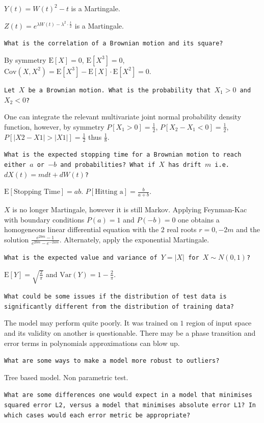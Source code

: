 $Y(t)=W(t)^2-t$ is a Martingale.

$Z(t)=e^{\lambda W(t) - \lambda^2 \cdot \frac{t}{2}}$ is a Martingale.

\texttt{What is the correlation of a Brownian motion and its square?}

By symmetry $\text{E}[X] = 0$, $\text{E}[X^3] = 0$, $\text{Cov}(X,X^2) = \text{E}[X^3]-\text{E}[X] \cdot \text{E}[X^2] = \boxed{0}$.

\texttt{Let $X$ be a Brownian motion. What is the probability that $X_1>0$ and $X_2<0$?}

One can integrate the relevant multivariate joint normal probability density function, however, by symmetry $P[X_1>0]=\frac{1}{2}$, $P[X_2-X_1<0]=\frac{1}{2}$, $P[|X2-X1|>|X1|]=\frac{1}{2}$ thus $\boxed{\frac{1}{8}}$.

\texttt{What is the expected stopping time for a Brownian motion to reach either $a$ or $-b$ and probabilities? What if $X$ has drift $m$ i.e. $dX(t)=m dt+d W(t)$?}

$\text{E}[\text{Stopping Time}]=\boxed{ab}$. $P[\text{Hitting a}]=\boxed{\frac{b}{a+b}}$.

$X$ is no longer Martingale, however it is still Markov. Applying Feynman-Kac with boundary conditions $P(a)=1$ and $P(-b)=0$ one obtains a homogeneous linear differential equation with the $2$ real roots $r = 0,-2m$ and the solution $\boxed{\frac{e^{2bm}-1}{e^{2bm}-e^{-2am}}}$. Alternately, apply the exponential Martingale.

\texttt{What is the expected value and variance of $Y=|X|$ for $X \sim N(0,1)$?}

$\text{E}[Y]=\boxed{\sqrt{\frac{2}{\pi}}}$ and $\text{Var}(Y)=\boxed{1-\frac{2}{\pi}}$.

\texttt{What could be some issues if the distribution of test data is significantly different from the distribution of training data?}

The model may perform quite poorly. It was trained on $1$ region of input space and its validity on another is questionable. There may be a phase transition and error terms in polynomials approximations can blow up.

\texttt{What are some ways to make a model more robust to outliers?}

Tree based model. Non parametric test.

\texttt{What are some differences one would expect in a model that minimises squared error L2, versus a model that minimises absolute error L1? In which cases would each error metric be appropriate?}


